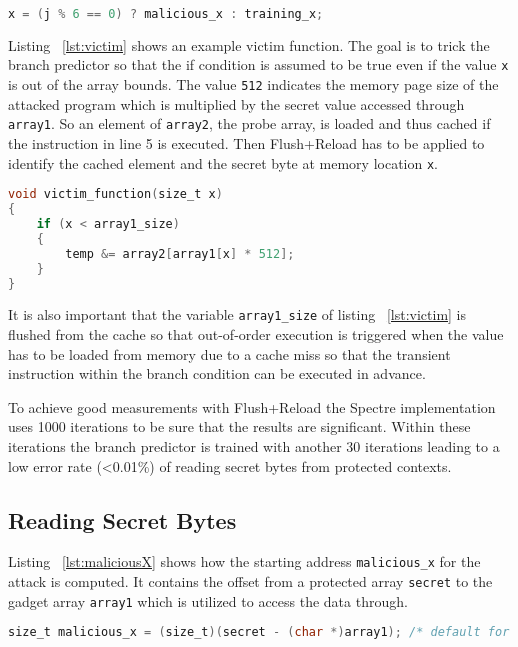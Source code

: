 \documentclass[a4paper,oneside,openright] {scrreprt}
\begin{document}
\begin{lstlisting}[language=C, caption=Spectre: Branch Predictor Tricking Simplified, label={lst:simplified}]
x = (j % 6 == 0) ? malicious_x : training_x;
\end{lstlisting}

Listing ~\ref{lst:victim} shows an example victim function. The goal is to trick the branch predictor so that the if condition is 
assumed to be true even if the value \texttt{x} is out of the array bounds. The value \texttt{512} indicates the memory page size of the
attacked program which is multiplied by the secret value accessed through \texttt{array1}. So an element of \texttt{array2}, the probe array, is loaded
and thus cached if the instruction in line 5 is executed. Then Flush+Reload has to be applied to identify the cached element
and the secret byte at memory location \texttt{x}.

\begin{lstlisting}[language=C, caption=Spectre: Example Victim Gadget, label={lst:victim}]
void victim_function(size_t x)
{
    if (x < array1_size)
    {
        temp &= array2[array1[x] * 512];
    }
}
\end{lstlisting}

It is also important that the variable \texttt{array1\_size} of listing ~\ref{lst:victim} is flushed from the cache so that out-of-order
execution is triggered when the value has to be loaded from memory due to a cache miss so that the transient instruction within
the branch condition can be executed in advance.

To achieve good measurements with Flush+Reload the Spectre implementation uses 1000 iterations to be sure that the results
are significant. Within these iterations the branch predictor is trained with another 30 iterations leading to a low error rate (<0.01\%)
of reading secret bytes from protected contexts.

\subsection{Reading Secret Bytes}
\label{ch:intro:motivation:A}

Listing ~\ref{lst:maliciousX} shows how the starting address \texttt{malicious\_x} for the attack is computed.
It contains the offset from a protected array \texttt{secret} to the gadget array \texttt{array1} 
which is utilized to access the data through.

\begin{lstlisting}[language=C, caption=Spectre: Malicious X, label={lst:maliciousX}]
size_t malicious_x = (size_t)(secret - (char *)array1); /* default for malicious_x */
\end{lstlisting}
\end{document}
